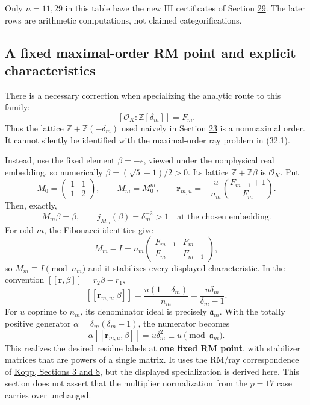 \documentclass[11pt,reqno]{amsart}
\theoremstyle{plain}
\begin{document}
Only \(n=11,29\) in this table have the new HI certificates of
Section \hyperref[sec:29]{29}. The later rows are arithmetic computations, not claimed
categorifications.

\subsection{A fixed maximal-order RM point and explicit characteristics}\label{sec:32.2}

There is a necessary correction when specializing the analytic route
to this family:
\[
 [\mathcal O_K:\mathbb Z[\delta_m]]=F_m.
\]
Thus the lattice \(\mathbb Z+\mathbb Z(-\delta_m)\) used naively in
Section \hyperref[sec:23]{23} is a nonmaximal order. It cannot silently be identified
with the maximal-order ray problem in (32.1).

Instead, use the fixed element \(\beta=-\epsilon\), viewed under the
nonphysical real embedding, so numerically
\(\beta=(\sqrt5-1)/2>0\). Its lattice
\(\mathbb Z+\mathbb Z\beta\) is \(\mathcal O_K\). Put
\begin{equation*}
 M_0=\begin{pmatrix}1&1\\1&2\end{pmatrix},\qquad M_m=M_0^m,
 \qquad
 \mathbf r_{m,u}=-\frac{u}{n_m}
 \binom{F_{m-1}+1}{F_m}.
 \tag{32.2}
\end{equation*}
Then, exactly,
\[
 M_m\beta=\beta,\qquad j_{M_m}(\beta)=\delta_m^{-2}>1
 \quad\text{at the chosen embedding}.
\]
For odd \(m\), the Fibonacci identities give
\[
 M_m-I=n_m
 \begin{pmatrix}F_{m-1}&F_m\\F_m&F_{m+1}\end{pmatrix},
\]
so \(M_m\equiv I\pmod{n_m}\) and it stabilizes every displayed
characteristic. In the convention
\([[\mathbf r,\beta]]=r_2\beta-r_1\),
\[
 [[\mathbf r_{m,u},\beta]]
 =\frac{u(1+\delta_m)}{n_m}
 =\frac{u\delta_m}{\delta_m-1}.
\]
For \(u\) coprime to \(n_m\), its denominator ideal is precisely
\(\mathfrak a_m\). With the totally positive generator
\(\alpha=\delta_m(\delta_m-1)\), the numerator becomes
\[
 \alpha[[\mathbf r_{m,u},\beta]]=u\delta_m^2
 \equiv u\pmod{\mathfrak a_m}.
\]
This realizes the desired residue labels at \textbf{one fixed RM point},
with stabilizer matrices that are powers of a single matrix.
It uses the RM/ray correspondence of
\href{https://arxiv.org/html/2411.06763v2}{Kopp, Sections 3 and 8}, but
the displayed specialization is derived here. This section does not
assert that the multiplier normalization from the \(p=17\) case
carries over unchanged.
\end{document}
